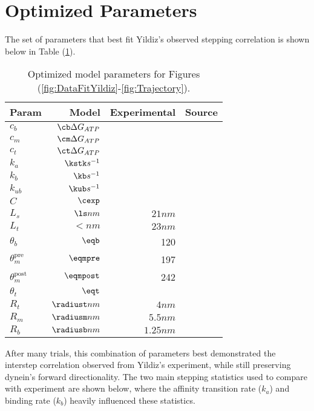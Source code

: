 \section{Optimized Parameters}\label{sec:Params}
The set of parameters that best fit Yildiz's observed stepping correlation is shown below in Table (\ref{tab:params}).

\begin{table}[H]
  \centering
  \begin{tabular}{|l | r | r | r|}
  	\hline
    Param & Model & Experimental & Source \\
    \hline
    $c_b$ & $\cb \Delta G_{ATP}$ &  & \\
    $c_m$ & $\cm \Delta G_{ATP}$ &  & \\
    $c_t$ & $\ct \Delta G_{ATP}$ &  & \\
    $k_a$ & $\kstk s^{-1}$&  & \\
    $k_b$ & $\kb s^{-1}$&  & \\
    $k_{ub}$ & $\kub s^{-1}$ & & \\
    $C$ & $\cexp$ & & \\
    $L_s$ & $\ls nm$ & $21nm$ & \cite{Burgess2003, 3vkh-cite, carter-paper}\\
    $L_t$ & $\lt nm$ & $23nm$ & \cite{Burgess2003, 3vkh-cite, carter-paper}\\
    $\theta_b$ & $\eqb$ &  120 & \cite{leschziner} \\
    $\theta_m^{\mbox{pre}}$ & $\eqmpre$ &  197 & \cite{Burgess2003}\\
    $\theta_m^{\mbox{post}}$ & $\eqmpost$ & 242 & \cite{Burgess2003}\\
    $\theta_t$ & $\eqt$ &  & \\
    $R_t$ & $\radiust nm$ & $4nm$ & \cite{Burgess2003}\\
    $R_m$ & $\radiusm nm$ & $5.5nm$ & \cite{Burgess2003}\\
    $R_b$ & $\radiusb nm$ & $1.25nm$ & \cite{Burgess2003}\\
    \hline
  \end{tabular}
  \caption{Optimized model parameters for Figures (\ref{fig:DataFitYildiz}-\ref{fig:Trajectory}).}
  \label{tab:params}
\end{table}

After many trials, this combination of parameters best demonstrated the interstep correlation observed from Yildiz's experiment, while still preserving dynein's forward directionality. The two main stepping statistics used to compare with experiment are shown below, where the affinity transition rate ($k_a$) and binding rate ($k_b$) heavily influenced these statistics.  

